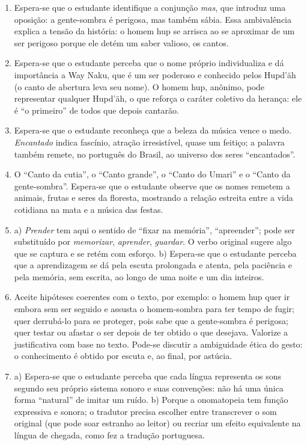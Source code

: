 \begin{enumerate}[label=\arabic*.]
\item Espera-se que o estudante identifique a conjunção
\textit{mas}, que introduz uma oposição: a gente-sombra é perigosa, mas
também sábia. Essa ambivalência explica a tensão da história: o homem
hup se arrisca ao se aproximar de um ser perigoso porque ele detém um
saber valioso, os cantos.

\item Espera-se que o estudante perceba que o nome próprio individualiza
e dá importância a Way Naku, que é um ser poderoso e conhecido pelos
Hupd'äh (o canto de abertura leva seu nome). O homem hup, anônimo, pode
representar qualquer Hupd'äh, o que reforça o caráter coletivo da
herança: ele é ``o primeiro'' de todos que depois cantarão.

\item Espera-se que o estudante reconheça que a beleza da música vence o
medo. \textit{Encantado} indica fascínio, atração irresistível, quase
um feitiço; a palavra também remete, no português do Brasil, ao universo
dos seres ``encantados''.

\item O ``Canto da cutia'', o ``Canto grande'', o ``Canto do Umari'' e o
``Canto da gente-sombra''. Espera-se que o estudante observe que os
nomes remetem a animais, frutas e seres da floresta, mostrando a relação
estreita entre a vida cotidiana na mata e a música das festas.

\item a) \textit{Prender} tem aqui o sentido de ``fixar na memória'',
``apreender''; pode ser substituído por \textit{memorizar},
\textit{aprender}, \textit{guardar}. O verbo original sugere algo que se
captura e se retém com esforço. b) Espera-se que o estudante perceba que
a aprendizagem se dá pela escuta prolongada e atenta, pela paciência e
pela memória, sem escrita, ao longo de uma noite e um dia inteiros.

\item Aceite hipóteses coerentes com o texto, por exemplo: o homem hup
quer ir embora sem ser seguido e assusta o homem-sombra para ter tempo
de fugir; quer derrubá-lo para se proteger, pois sabe que a gente-sombra
é perigosa; quer testar ou afastar o ser depois de ter obtido o que
desejava. Valorize a justificativa com base no texto. Pode-se discutir a
ambiguidade ética do gesto: o conhecimento é obtido por escuta e, ao
final, por astúcia.

\item a) Espera-se que o estudante perceba que cada língua representa os
sons segundo seu próprio sistema sonoro e suas convenções: não há uma
única forma ``natural'' de imitar um ruído. b) Porque a onomatopeia tem
função expressiva e sonora; o tradutor precisa escolher entre
transcrever o som original (que pode soar estranho ao leitor) ou recriar
um efeito equivalente na língua de chegada, como fez a tradução
portuguesa.


\end{enumerate}

